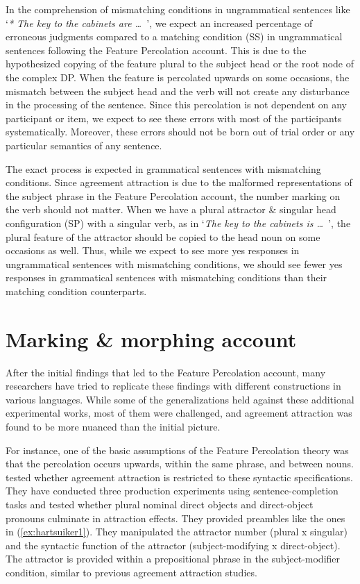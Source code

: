 In the comprehension of mismatching conditions in ungrammatical sentences like `\emph{* The key to the cabinets are \ldots{\ }}', we expect an increased percentage of erroneous judgments compared to a matching condition (SS) in ungrammatical sentences following the Feature Percolation account. This is due to the hypothesized copying of the feature plural to the subject head or the root node of the complex DP. When the feature is percolated upwards on some occasions, the mismatch between the subject head and the verb will not create any disturbance in the processing of the sentence. Since this percolation is not dependent on any participant or item, we expect to see these errors with most of the participants systematically. Moreover, these errors should not be born out of trial order or any particular semantics of any sentence. 

The exact process is expected in grammatical sentences with mismatching conditions. Since agreement attraction is due to the malformed representations of the subject phrase in the Feature Percolation account, the number marking on the verb should not matter. When we have a plural attractor \& singular head configuration (SP) with a singular verb, as in `\emph{The key to the cabinets is \ldots{\ }}', the plural feature of the attractor should be copied to the head noun on some occasions as well. Thus, while we expect to see more yes responses in ungrammatical sentences with mismatching conditions, we should see fewer yes responses in grammatical sentences with mismatching conditions than their matching condition counterparts. 


\section{Marking \& morphing account} \label{sec:mm}

After the initial findings that led to the Feature Percolation account, many researchers have tried to replicate these findings with different constructions in various languages. While some of the generalizations held against these additional experimental works, most of them were challenged, and agreement attraction was found to be more nuanced than the initial picture. 

For instance, one of the basic assumptions of the Feature Percolation theory was that the percolation occurs upwards, within the same phrase, and between nouns.  tested whether agreement attraction is restricted to these syntactic specifications. They have conducted three production experiments using sentence-completion tasks and tested whether plural nominal direct objects and direct-object pronouns culminate in attraction effects. They provided preambles like the ones in (\ref{ex:hartsuiker1}). They manipulated the attractor number (plural x singular) and the syntactic function of the attractor (subject-modifying x direct-object). The attractor is provided within a prepositional phrase in the subject-modifier condition, similar to previous agreement attraction studies. 

